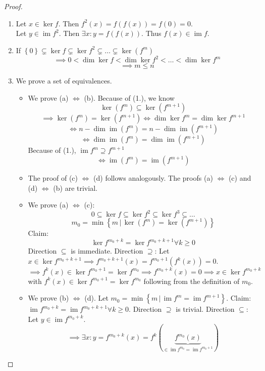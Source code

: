 \documentclass{article}
\numberwithin{lecref}{section}
\newcommand{\set}[1]{\left\{#1\right\}}
\newcommand{\setdef}[2]{\left\{\left.#1\,\right|\,#2\right\}}
\DeclareMathOperator{\im}{im}
\begin{document}
\begin{proof}
  \begin{enumerate} %
    \item Let $x \in \ker{f}$. Then $f^2(x) = f(f(x)) = f(0) = 0$. \\
      Let $y \in \im{f^2}$. Then $\exists x: y = f(f(x))$. Thus $f(x) \in \im{f}$.
    \item If $\set{0} \subsetneq \ker{f} \subsetneq \ker{f^2} \subsetneq \dots \subsetneq \ker(f^m)$
      \[ \implies 0 < \dim{\ker{f}} < \dim{\ker{f^2}} < \dots < \dim{\ker{f^m}} \]
      \[ \implies m \leq n \]
    \item We prove a set of equivalences.
      \begin{itemize}
        \item 
          We prove (a) $\iff$ (b).
          Because of (1.), we know
          \[ \ker(f^m) \subseteq \ker(f^{m+1}) \]
          \[ \implies \ker(f^m) = \ker(f^{m+1}) \iff \dim\ker{f^m} = \dim\ker{f^{m+1}} \]
          \[ \iff n - \dim\im(f^m) = n - \dim\im(f^{m+1}) \]
          \[ \iff \dim\im(f^m) = \dim\im(f^{m+1}) \]
          Because of (1.), $\im{f^m} \supseteq f^{m+1}$
          \[ \iff \im(f^m) = \im(f^{m+1}) \]
        \item
          The proof of (c) $\iff$ (d) follows analogously.
          The proofs (a) $\iff$ (c) and (d) $\iff$ (b) are trivial.
        \item
          We prove (a) $\iff$ (c):
          \[ 0 \subseteq \ker{f} \subseteq \ker{f^2} \subseteq \ker{f^3} \subseteq \dots \]
          \[ m_0 = \min\setdef{m}{\ker(f^m) = \ker(f^{m+1})} \]
          Claim:
          \[ \ker{f^{m_0 + k}} = \ker{f^{m_0 + k + 1}} \forall k \geq 0 \]
          Direction $\subseteq$ is immediate.
          Direction $\supseteq$: Let $x \in \ker{f^{m_0 + k + 1}} \implies f^{m_0 + k + 1}(x) = f^{m_0 + 1}(f^k(x)) = 0$.
          \[ \implies f^k(x) \in \ker{f^{m_0 + 1}} = \ker{f^{m_0}} \implies f^{m_0 + k}(x) = 0 \implies x \in \ker{f^{m_0 + k}} \]
          with $f^k(x) \in \ker{f^{m_0 + 1}} = \ker{f^{m_0}}$ following from the definition of $m_0$.
        \item
          We prove (b) $\iff$ (d).
          Let $m_0 = \min\setdef{m}{\im{f^m} = \im{f^{m+1}}}$.
          Claim: $\im{f^{m_0 + k}} = \im{f^{m_0 + k + 1}} \forall k \geq 0$.
          Direction $\supseteq$ is trivial.
          Direction $\subseteq$:
          Let $y \in \im{f^{m_0 + k}}$.
          \[ \implies \exists x: y = f^{m_0 + k}(x) = f^k(\underbrace{f^{m_0}(x)}_{\in \im{f^{m_0} = \im{f^{m_0 + 1}}}}) \]

\end{itemize}
\end{enumerate}
\end{proof}
\end{document}
